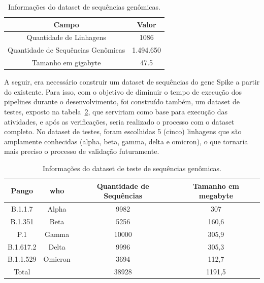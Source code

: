 \begin{table}[htb]
  \caption{Informações do dataset de sequências genômicas.}
  \begin{center}
    \begin{tabular}{c|c}
      \hline
      Campo                              & Valor     \\
      \hline
      Quantidade de Linhagens            & 1086      \\
      Quantidade de Sequências Genômicas & 1.494.650 \\
      Tamanho em \gls{gigabyte}          & 47.5      \\
      \hline
    \end{tabular}
  \end{center}
  \label{tab:datasetGenomas}
\end{table}

A seguir, era necessário construir um dataset de sequências do gene Spike a partir do existente. Para isso, com o objetivo de diminuir o tempo de execução dos pipelines durante o desenvolvimento, foi construído também, um dataset de testes, exposto na tabela~\ref{tab:datasetGenomasTeste}, que serviriam como base para execução das atividades, e após as verificações, seria realizado o processo com o dataset completo. No dataset de testes, foram escolhidas 5 (cinco) linhagens que são amplamente conhecidas (alpha, beta, gamma, delta e omicron), o que tornaria mais preciso o processo de validação futuramente.

\begin{table}[htb]
  \caption{Informações do dataset de teste de sequências genômicas.}
  \begin{center}
    \begin{tabular}{c|c|c|c}
      \hline
      Pango     & \gls{who} & Quantidade de Sequências & Tamanho em \gls{megabyte} \\
      \hline
      B.1.1.7   & Alpha     & 9982                     & 307                       \\
      B.1.351   & Beta      & 5256                     & 160,6                     \\
      P.1       & Gamma     & 10000                    & 305,9                     \\
      B.1.617.2 & Delta     & 9996                     & 305,3                     \\
      B.1.1.529 & Omicron   & 3694                     & 112,7                     \\
      \hline
      Total     &           & 38928                    & 1191,5                    \\
      \hline
    \end{tabular}
  \end{center}
  \label{tab:datasetGenomasTeste}
\end{table}

